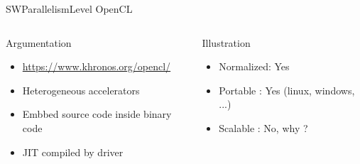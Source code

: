 %
\begin{Frame}{SWParallelismLevel OpenCL}
  \begin{columns}[t]
    \begin{column}{\HW} %
      \begin{block}{Argumentation}
        \begin{itemize}
        \item
          \href{https://www.khronos.org/opencl/}{https://www.khronos.org/opencl/}
        \item Heterogeneous accelerators
        \item Embbed source code inside binary code
        \item JIT compiled by driver
        \end{itemize}
      \end{block} 
    \end{column}
    
    \begin{column}{\HW} %
      \begin{alertblock}{Illustration}
        \begin{itemize}
        \item Normalized: Yes 
        \item Portable : Yes (linux, windows, ...)
        \item Scalable : No, why ?
        \end{itemize}
      \end{alertblock}   
    \end{column}
  \end{columns}  
\end{Frame}


